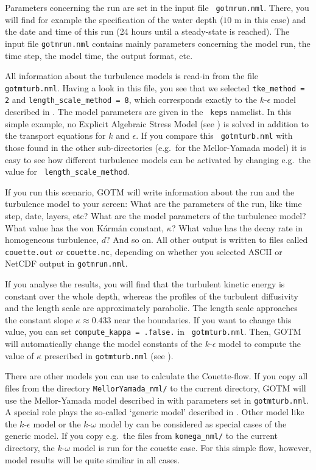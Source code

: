 Parameters concerning the run are set in the input file {\tt
gotmrun.nml}. There, you will find for example the specification of
the water depth ($10$ m in this case) and the date and time of this
run (24 hours until a steady-state is reached). The input file
{\tt gotmrun.nml} contains mainly parameters concerning the model run,
the time step, the model time, the output format, etc.

All information about the turbulence models is read-in from the file
{\tt gotmturb.nml}. Having a look in this file, you see that we
selected {\tt tke\_method = 2} and {\tt length\_scale\_method = 8},
which corresponds exactly to the $k$-$\epsilon$ model described in
. The model parameters are given in the {\tt
keps} namelist. In this simple example, no Explicit Algebraic Stress
Model (see ) is solved in addition to the
transport equations for $k$ and $\epsilon$. If you compare this {\tt
gotmturb.nml} with those found in the other sub-directories (e.g.\ for
the Mellor-Yamada model) it is easy to see how different turbulence
models can be activated by changing e.g.\ the value for {\tt
length\_scale\_method}.

If you run this scenario, GOTM will write information about the run
and the turbulence model to your screen: What are the parameters of
the run, like time step, date, layers, etc? What are the model
parameters of the turbulence model? What value has the von
K{\'a}rm{\'a}n constant, $\kappa$?  What value has the decay rate in
homogeneous turbulence, $d$? And so on. All other output is written to
files called {\tt couette.out} or {\tt couette.nc}, depending on
whether you selected ASCII or NetCDF output in {\tt gotmrun.nml}.

If you analyse the results, you will find that the turbulent kinetic
energy is constant over the whole depth, whereas the profiles of the
turbulent diffusivity and the length scale are approximately
parabolic. The length scale approaches the constant slope $\kappa
\approx 0.433$ near the boundaries. If you want to change this value,
you can set {\tt compute\_kappa = .false.} in {\tt
gotmturb.nml}. Then, GOTM will automatically change the model
constants of the $k$-$\epsilon$ model to compute the value of $\kappa$
prescribed in {\tt gotmturb.nml} (see ).

There are other models you can use to calculate the Couette-flow.  If
you copy all files from the directory {\tt MellorYamada\_nml/} to the
current directory, GOTM will use the Mellor-Yamada model described in
 with parameters set in {\tt gotmturb.nml}.  A
special role plays the so-called `generic model' described in
. Other model like the $k$-$\epsilon$ model or the
$k$-$\omega$ model by \cite{Umlaufetal2003} can be considered as
special cases of the generic model. If you copy e.g.\ the files from
{\tt komega\_nml/} to the current directory, the $k$-$\omega$ model is
run for the couette case. For this simple flow, however, model results
will be quite similiar in all cases.




